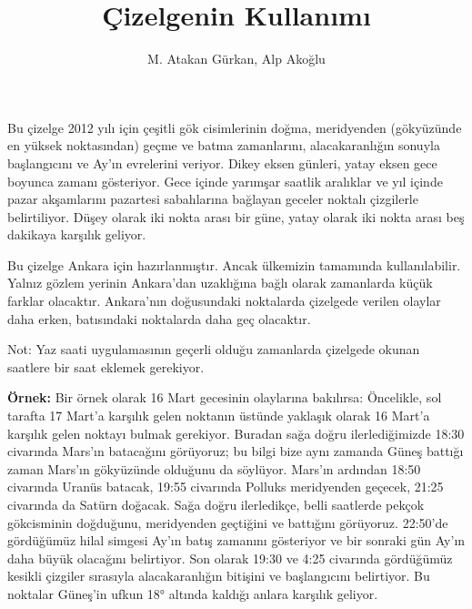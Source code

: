 \documentclass[12pt]{article}
\author{M. Atakan Gürkan, Alp Akoğlu}
\title{Çizelgenin Kullanımı}
\date{}
\begin{document}
\maketitle
Bu çizelge 2012 yılı için çeşitli gök cisimlerinin doğma,
meridyenden (gökyüzünde en yüksek noktasından) geçme ve batma
zamanlarını, alacakaranlığın sonuyla başlangıcını ve Ay’ın
evrelerini veriyor. Dikey eksen günleri, yatay eksen gece boyunca
zamanı gösteriyor. Gece içinde yarımşar saatlik aralıklar ve yıl
içinde pazar akşamlarını pazartesi sabahlarına bağlayan geceler
noktalı çizgilerle belirtiliyor. Düşey olarak iki nokta arası
bir güne, yatay olarak iki nokta arası beş dakikaya karşılık
geliyor.

Bu çizelge Ankara için hazırlanmıştır. Ancak ülkemizin
tamamında kullanılabilir. Yalnız gözlem yerinin Ankara’dan
uzaklığına bağlı olarak zamanlarda küçük farklar olacaktır.
Ankara’nın doğusundaki noktalarda çizelgede verilen olaylar daha
erken, batısındaki noktalarda daha geç olacaktır.

Not: Yaz saati uygulamasının geçerli olduğu zamanlarda çizelgede
okunan saatlere bir saat eklemek gerekiyor.

{\bfseries Örnek:}
Bir örnek olarak 16 Mart gecesinin olaylarına bakılırsa:
Öncelikle, sol tarafta 17 Mart’a karşılık gelen noktanın
üstünde yaklaşık olarak 16 Mart’a karşılık gelen noktayı
bulmak gerekiyor.  Buradan sağa doğru ilerlediğimizde 18:30
civarında Mars'ın batacağını görüyoruz; bu bilgi bize aynı
zamanda Güneş battığı zaman Mars'ın gökyüzünde olduğunu
da söylüyor. Mars'ın ardından 18:50 civarında Uranüs batacak,
19:55 civarında Polluks meridyenden geçecek, 21:25 civarında da
Satürn doğacak.  Sağa doğru ilerledikçe, belli
saatlerde pekçok gökcisminin doğduğunu, meridyenden geçtiğini
ve battığını gö\-rü\-yo\-ruz. 22:50'de gördüğümüz hilal simgesi
Ay'ın batış zamanını gösteriyor ve bir sonraki gün Ay'ın daha
büyük olacağını belirtiyor.  Son olarak 19:30 ve 4:25 civarında
gördüğümüz kesikli çizgiler sırasıyla alacakaranlığın
bitişini ve başlangıcını belirtiyor. Bu noktalar Güneş’in
ufkun 18° altında kaldığı anlara karşılık geliyor.
\end{document}
